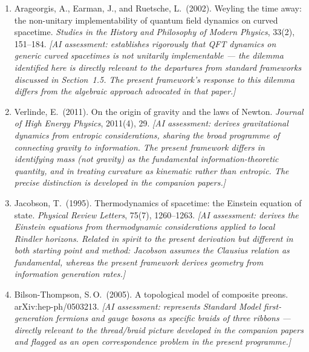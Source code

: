 \documentclass[12pt]{article}
\begin{document}
\begin{enumerate}

  \item Arageorgis, A., Earman, J., and Ruetsche, L.\ (2002).
        Weyling the time away: the non-unitary implementability of
        quantum field dynamics on curved spacetime.
        \textit{Studies in the History and Philosophy of Modern Physics},
        33(2), 151--184.
        \textit{[AI assessment: establishes rigorously that QFT dynamics
        on generic curved spacetimes is not unitarily implementable ---
        the dilemma identified here is directly relevant to the
        departures from standard frameworks discussed in Section~1.5.
        The present framework's response to this dilemma differs from
        the algebraic approach advocated in that paper.]}

  \item Verlinde, E.\ (2011).
        On the origin of gravity and the laws of Newton.
        \textit{Journal of High Energy Physics}, 2011(4), 29.
        \textit{[AI assessment: derives gravitational dynamics from
        entropic considerations, sharing the broad programme of
        connecting gravity to information. The present framework
        differs in identifying mass (not gravity) as the fundamental
        information-theoretic quantity, and in treating curvature as
        kinematic rather than entropic. The precise distinction is
        developed in the companion papers.]}

  \item Jacobson, T.\ (1995).
        Thermodynamics of spacetime: the Einstein equation of state.
        \textit{Physical Review Letters}, 75(7), 1260--1263.
        \textit{[AI assessment: derives the Einstein equations from
        thermodynamic considerations applied to local Rindler horizons.
        Related in spirit to the present derivation but different in
        both starting point and method: Jacobson assumes the Clausius
        relation as fundamental, whereas the present framework derives
        geometry from information generation rates.]}

  \item Bilson-Thompson, S.\,O.\ (2005).
        A topological model of composite preons.
        arXiv:hep-ph/0503213.
        \textit{[AI assessment: represents Standard Model first-generation
        fermions and gauge bosons as specific braids of three ribbons ---
        directly relevant to the thread/braid picture developed in the
        companion papers and flagged as an open correspondence problem
        in the present programme.]}


\end{enumerate}
\end{document}

